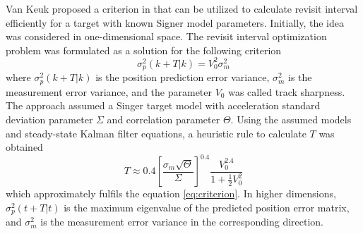 \documentclass[english, 12pt, a4paper, elec, utf8, a-1b, online]{aaltothesis}
\begin{document}
Van Keuk proposed a criterion in \cite{Keuk1975} that can be utilized to calculate revisit interval efficiently for a target with known Signer model parameters.
Initially, the idea was considered in one-dimensional space.
The revisit interval optimization problem was formulated as a solution for the following criterion
\begin{equation} \label{eq:criterion}
    \sigma_p^2(k + T | k) = V_0^2 \sigma_m^2
\end{equation}
where $\sigma_p^2(k + T | k)$ is the position prediction error variance, $\sigma_m^2$ is the measurement error variance, and
the parameter $V_0$ was called track sharpness.
The approach assumed a Singer target model with acceleration standard deviation parameter $\Sigma$ and correlation parameter $\Theta$.
Using the assumed models and steady-state Kalman filter equations, a heuristic rule to calculate $T$ was obtained
\begin{equation}\label{eq:keuk_time}
    T \approx 0.4 \left[ \frac{\sigma_m \sqrt{\Theta}}{\Sigma} \right]^{0.4} \frac{V_0^{2.4}}{1+\frac{1}{2}V_0^2}
\end{equation}
which approximately fulfils the equation \eqref{eq:criterion}.
In higher dimensions, $\sigma_p^2(t + T | t)$ is the maximum eigenvalue of the predicted position error matrix, and $\sigma_m^2$ is the measurement error variance in the corresponding direction.
\end{document}
